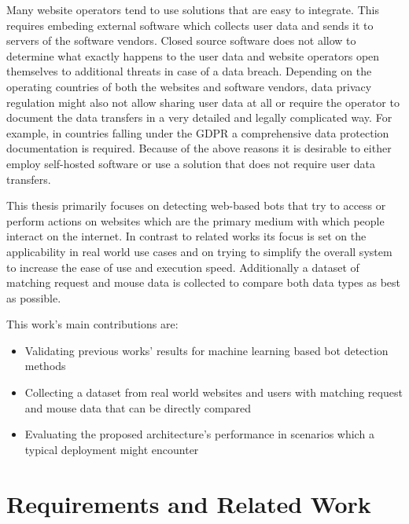 \documentclass[
    fontsize=12pt,
    headings=small,
    parskip=half,           %
    bibliography=totoc,
    numbers=noenddot,       %
    open=any,               %
    final,                   %
    table
]{scrreprt}
\begin{document}
Many website operators tend to use solutions that are easy to integrate. This requires embeding external software which collects user data and sends it to servers of the software vendors. Closed source software does not allow to determine what exactly happens to the user data and website operators open themselves to additional threats in case of a data breach. Depending on the operating countries of both the websites and software vendors, data privacy regulation might also not allow sharing user data at all or require the operator to document the data transfers in a very detailed and legally complicated way. For example, in countries falling under the GDPR \cite{GDPR} a comprehensive data protection documentation is required. Because of the above reasons it is desirable to either employ self-hosted software or use a solution that does not require user data transfers.

This thesis primarily focuses on detecting web-based bots that try to access or perform actions on websites which are the primary medium with which people interact on the internet. In contrast to related works its focus is set on the applicability in real world use cases and on trying to simplify the overall system to increase the ease of use and execution speed. Additionally a dataset of matching request and mouse data is collected to compare both data types as best as possible.

This work's main contributions are:

\begin{itemize}
    \item Validating previous works' results for machine learning based bot detection methods
    \item Collecting a dataset from real world websites and users with matching request and mouse data that can be directly compared
    \item Evaluating the proposed architecture's performance in scenarios which a typical deployment might encounter
\end{itemize}


\chapter{Requirements and Related Work}

\end{document}
